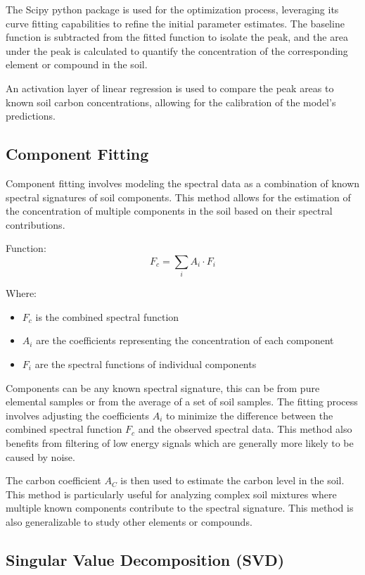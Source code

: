 \documentclass[review]{elsarticle}
\begin{document}
The Scipy python package is used for the optimization process, leveraging its curve fitting capabilities to refine the initial parameter estimates. The baseline function is subtracted from the fitted function to isolate the peak, and the area under the peak is calculated to quantify the concentration of the corresponding element or compound in the soil.

An activation layer of linear regression is used to compare the peak areas to known soil carbon concentrations, allowing for the calibration of the model's predictions.

\subsection{Component Fitting}

Component fitting involves modeling the spectral data as a combination of known spectral signatures of soil components. This method allows for the estimation of the concentration of multiple components in the soil based on their spectral contributions.

Function: 
\begin{equation}
F_c = \sum_i A_i \cdot F_i
\end{equation}

Where:
\begin{itemize}
\item $F_c$ is the combined spectral function
\item $A_i$ are the coefficients representing the concentration of each component
\item $F_i$ are the spectral functions of individual components
\end{itemize}

Components can be any known spectral signature, this can be from pure elemental samples or from the average of a set of soil samples. The fitting process involves adjusting the coefficients $A_i$ to minimize the difference between the combined spectral function $F_c$ and the observed spectral data. This method also benefits from filtering of low energy signals which are generally more likely to be caused by noise.

The carbon coefficient $A_C$ is then used to estimate the carbon level in the soil. This method is particularly useful for analyzing complex soil mixtures where multiple known components contribute to the spectral signature. This method is also generalizable to study other elements or compounds.

\subsection{Singular Value Decomposition (SVD)}
\end{document}
